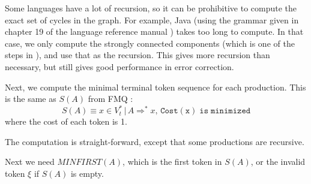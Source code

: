 \documentclass{article}
\begin{document}
Some languages have a lot of recursion, so it can be prohibitive to
compute the exact set of cycles in the graph. For example, Java (using
the grammar given in chapter 19 of the language reference manual
\cite{javarm}) takes too long to compute. In that case, we only
compute the strongly connected components (which is one of the steps
in \cite{graph-cycles}), and use that as the recursion. This gives
more recursion than necessary, but still gives good performance in
error correction.

Next, we compute the minimal terminal token sequence for each production.
This is the same as $S(A)$ from FMQ \cite{FMQ 1980}:
\begin{equation}
S(A) \equiv x \in V_t^* \, |\, A \Rightarrow^* x, \, \mathtt{Cost(x)\; is\; minimized}
\end{equation}
where the cost of each token is 1.

The computation is straight-forward, except that some productions are
recursive.

Next we need $MINFIRST(A)$, which is the first token in $S(A)$, or the
invalid token $\xi$ if $S(A)$ is empty.
\end{document}
